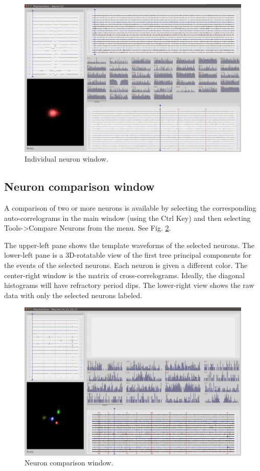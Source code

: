 \documentclass[hidelinks,10pt]{article}
\begin{document}
\begin{figure}[!h]
\centering
\includegraphics[width=6in]{images/mountainview_neuron_window.png}
\caption{
Individual neuron window.
}
\label{fig:mountainview_neuron_window}
\end{figure}

\subsection {Neuron comparison window}

A comparison of two or more neurons is available by selecting the corresponding auto-correlograms in the main window (using the Ctrl Key) and then selecting Tools->Compare Neurons from the menu. See Fig. \ref{fig:mountainview_compare_window}.

The upper-left pane shows the template waveforms of the selected neurons. The lower-left pane is a 3D-rotatable view of the first tree principal components for the events of the selected neurons. Each neuron is given a different color. The center-right window is the matrix of cross-correlograms. Ideally, the diagonal histograms will have refractory period dips. The lower-right view shows the raw data with only the selected neurons labeled.

\begin{figure}[!h]
\centering
\includegraphics[width=6in]{images/mountainview_compare_window.png}
\caption{
Neuron comparison window.
}
\label{fig:mountainview_compare_window}
\end{figure}
\end{document}
